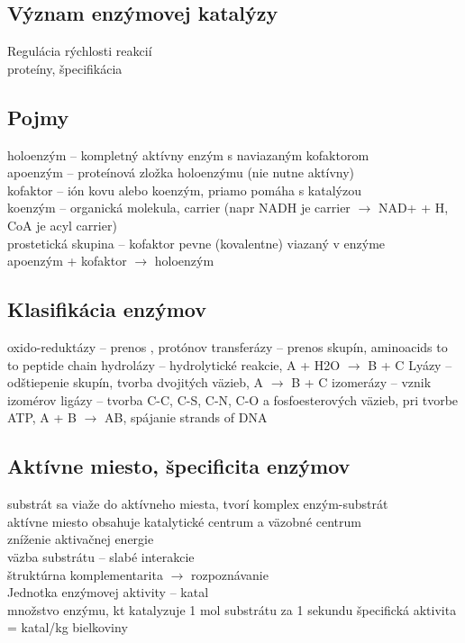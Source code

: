 \subsection*{Význam enzýmovej katalýzy}
Regulácia rýchlosti reakcií\\
proteíny, špecifikácia\\
\subsection*{Pojmy}
holoenzým -- kompletný aktívny enzým s naviazaným kofaktorom\\
apoenzým -- proteínová zložka holoenzýmu (nie nutne aktívny)\\
kofaktor -- ión kovu alebo koenzým, priamo pomáha s katalýzou\\
koenzým -- organická molekula, carrier (napr NADH je \el carrier $\rightarrow$ NAD+ + H, CoA je acyl carrier)\\
prostetická skupina -- kofaktor pevne (kovalentne) viazaný v enzýme\\
apoenzým + kofaktor $\rightarrow$ holoenzým
\subsection*{Klasifikácia enzýmov}
oxido-reduktázy -- prenos \el, protónov
transferázy -- prenos skupín, aminoacids to to peptide chain
hydrolázy -- hydrolytické reakcie, A + H2O $\rightarrow$ B + C
Lyázy -- odštiepenie skupín, tvorba dvojitých väzieb, A $\rightarrow$ B + C
izomerázy -- vznik izomérov
ligázy -- tvorba C-C, C-S, C-N, C-O a fosfoesterových väzieb, pri tvorbe ATP, A + B $\rightarrow$ AB, spájanie strands of DNA
\subsection*{Aktívne miesto, špecificita enzýmov}
substrát sa viaže do aktívneho miesta, tvorí komplex enzým-substrát\\
aktívne miesto obsahuje katalytické centrum a väzobné centrum\\
zníženie aktivačnej energie\\
väzba substrátu -- slabé interakcie\\
štruktúrna komplementarita $\rightarrow$ rozpoznávanie\\

Jednotka enzýmovej aktivity -- katal\\
\tab množstvo enzýmu, kt katalyzuje 1 mol substrátu za 1 sekundu
\tab špecifická aktivita = katal/kg bielkoviny
